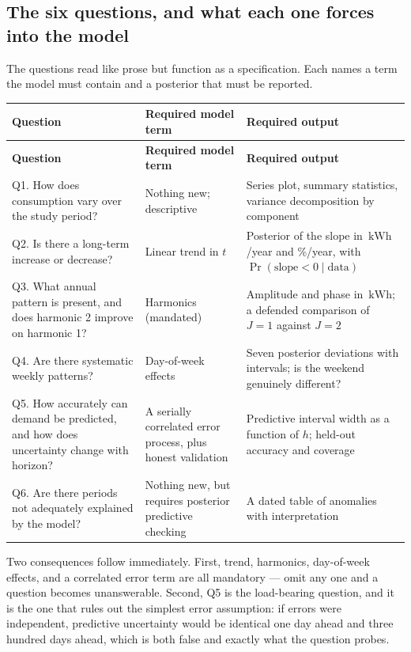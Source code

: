 \documentclass[11pt]{article}
\newcommand{\kwh}{\,\mathrm{kWh}}
\begin{document}
\subsection{The six questions, and what each one forces into the model}

The questions read like prose but function as a specification. Each names a
term the model must contain and a posterior that must be reported.

{\small
\begin{longtable}{@{}p{}p{}p{}@{}}
\toprule
\textbf{Question} & \textbf{Required model term} & \textbf{Required output} \\
\midrule
\endfirsthead
\toprule
\textbf{Question} & \textbf{Required model term} & \textbf{Required output} \\
\midrule
\endhead
Q1. How does consumption vary over the study period?
& Nothing new; descriptive
& Series plot, summary statistics, variance decomposition by component \\[3pt]
Q2. Is there a long-term increase or decrease?
& Linear trend in $t$
& Posterior of the slope in $\kwh$/year and \%/year, with
  $\Pr(\text{slope}<0\mid\text{data})$ \\[3pt]
Q3. What annual pattern is present, and does harmonic 2 improve on harmonic 1?
& Harmonics (mandated)
& Amplitude and phase in $\kwh$; a defended comparison of $J{=}1$ against $J{=}2$ \\[3pt]
Q4. Are there systematic weekly patterns?
& Day-of-week effects
& Seven posterior deviations with intervals; is the weekend genuinely different? \\[3pt]
Q5. How accurately can demand be predicted, and how does uncertainty change with horizon?
& A serially correlated error process, plus honest validation
& Predictive interval width as a function of $h$; held-out accuracy and coverage \\[3pt]
Q6. Are there periods not adequately explained by the model?
& Nothing new, but requires posterior predictive checking
& A dated table of anomalies with interpretation \\
\bottomrule
\end{longtable}
}

Two consequences follow immediately. First, trend, harmonics, day-of-week
effects, and a correlated error term are all mandatory --- omit any one and a
question becomes unanswerable. Second, Q5 is the load-bearing question, and it
is the one that rules out the simplest error assumption: if errors were
independent, predictive uncertainty would be identical one day ahead and three
hundred days ahead, which is both false and exactly what the question probes.
\end{document}
